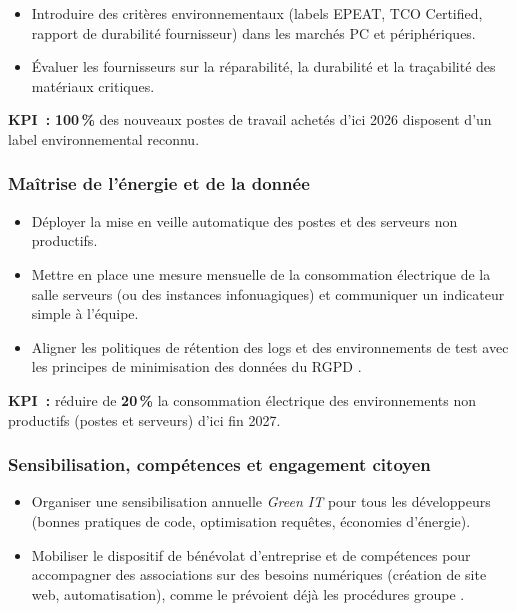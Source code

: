 \begin{itemize}
    \item Introduire des critères environnementaux (labels EPEAT, TCO Certified, rapport de durabilité fournisseur) dans les marchés PC et périphériques.
    \item Évaluer les fournisseurs sur la réparabilité, la durabilité et la traçabilité des matériaux critiques.
\end{itemize}

\textbf{KPI~:} \textbf{100\,\%} des nouveaux postes de travail achetés d'ici 2026 disposent d'un label environnemental reconnu.

\subsubsection*{Maîtrise de l'énergie et de la donnée}

\begin{itemize}
    \item Déployer la mise en veille automatique des postes et des serveurs non productifs.
    \item Mettre en place une mesure mensuelle de la consommation électrique de la salle serveurs (ou des instances infonuagiques) et communiquer un indicateur simple à l'équipe.
    \item Aligner les politiques de rétention des logs et des environnements de test avec les principes de minimisation des données du RGPD \cite{iveco_privacy_2025}.
\end{itemize}

\textbf{KPI~:} réduire de \textbf{20\,\%} la consommation électrique des environnements non productifs (postes et serveurs) d'ici fin 2027.

\subsubsection*{Sensibilisation, compétences et engagement citoyen}

\begin{itemize}
    \item Organiser une sensibilisation annuelle \textit{Green IT} pour tous les développeurs (bonnes pratiques de code, optimisation requêtes, économies d'énergie).
    \item Mobiliser le dispositif de bénévolat d'entreprise et de compétences pour accompagner des associations sur des besoins numériques (création de site web, automatisation), comme le prévoient déjà les procédures groupe \cite{iveco_local_corp_2025, iveco_local_subs_2025}.
\end{itemize}

